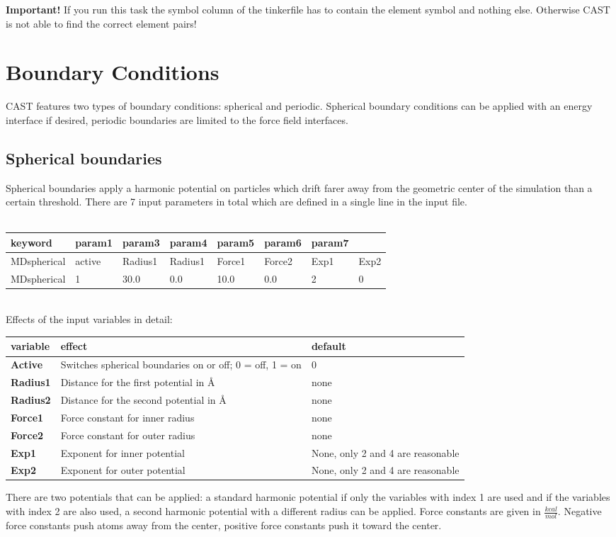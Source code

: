 \documentclass[10pt,a4paper]{article} %
\begin{document}
\textbf{Important!} If you run this task the symbol column of the tinkerfile has to contain the element symbol and nothing else. Otherwise CAST is not able to find the correct element pairs!
		

	\section{Boundary Conditions}
	\label{sec:boundary}
	\ac{CAST} features two types of boundary conditions: spherical and periodic. Spherical boundary conditions can be applied with an energy interface if desired, periodic boundaries are limited to the force field interfaces.

	\subsection{Spherical boundaries}
	Spherical boundaries apply a harmonic potential on particles which drift farer away from the geometric center of the simulation than a certain threshold. There are 7 input parameters in total which are defined in a single line in the input file. \\~\\

	\begin{longtable}{l|l|l|l|l|l|l|l}
		keyword & param1 & param3 & param4 & param5 & param6 & param7 \\
		\hline
		MDspherical & active & Radius1 & Radius1 & Force1 & Force2 & Exp1 & Exp2 \\
		MDspherical & 1 & 30.0 & 0.0 & 10.0 & 0.0 & 2 & 0 \\
	\end{longtable}~\\

	Effects of the input variables in detail:
	\begin{longtable}{|p{3cm}|p{5cm}|p{3cm}|}
		\textbf{variable} & effect & default \\
		\hline
		\textbf{Active} & Switches spherical boundaries on or off; 0 = off, 1 = on & 0 \\
		\textbf{Radius1} & Distance for the first potential in \AA & none \\
		\textbf{Radius2} & Distance for the second potential in \AA & none \\
		\textbf{Force1} & Force constant for inner radius & none \\
		\textbf{Force2} & Force constant for outer radius & none \\
		\textbf{Exp1} & Exponent for inner potential & None, only 2 and 4 are reasonable \\
		\textbf{Exp2} & Exponent for outer potential & None, only 2 and 4 are reasonable \\
	\end{longtable}
	There are two potentials that can be applied: a standard harmonic potential if only the variables with index 1 are used and if the variables with index 2 are also used, a second harmonic potential with a different radius can be applied.
	Force constants are given in $\frac{kcal}{mol}$. Negative force constants push atoms away from the center, positive force constants push it toward the center.
\end{document}
